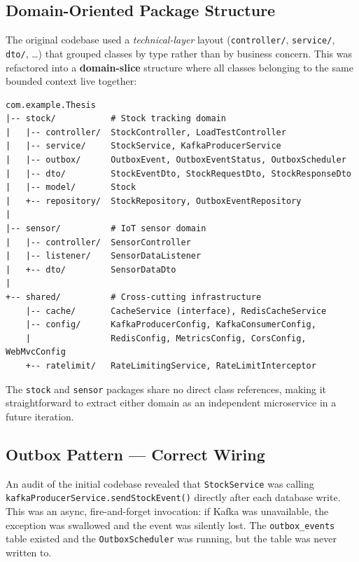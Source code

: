 \documentclass[12pt,a4paper,twoside]{article}
\begin{document}
\subsection{Domain-Oriented Package Structure}

The original codebase used a \emph{technical-layer} layout
(\texttt{controller/}, \texttt{service/}, \texttt{dto/}, \ldots{}) that
grouped classes by type rather than by business concern.
This was refactored into a \textbf{domain-slice} structure where all classes
belonging to the same bounded context live together:

\begin{lstlisting}[style=yamlStyle,
  caption={Domain-sliced Java package layout (final)}]
com.example.Thesis
|-- stock/           # Stock tracking domain
|   |-- controller/  StockController, LoadTestController
|   |-- service/     StockService, KafkaProducerService
|   |-- outbox/      OutboxEvent, OutboxEventStatus, OutboxScheduler
|   |-- dto/         StockEventDto, StockRequestDto, StockResponseDto
|   |-- model/       Stock
|   +-- repository/  StockRepository, OutboxEventRepository
|
|-- sensor/          # IoT sensor domain
|   |-- controller/  SensorController
|   |-- listener/    SensorDataListener
|   +-- dto/         SensorDataDto
|
+-- shared/          # Cross-cutting infrastructure
    |-- cache/       CacheService (interface), RedisCacheService
    |-- config/      KafkaProducerConfig, KafkaConsumerConfig,
    |                RedisConfig, MetricsConfig, CorsConfig, WebMvcConfig
    +-- ratelimit/   RateLimitingService, RateLimitInterceptor
\end{lstlisting}

The \texttt{stock} and \texttt{sensor} packages share no direct class
references, making it straightforward to extract either domain as an
independent microservice in a future iteration.

\subsection{Outbox Pattern --- Correct Wiring}

An audit of the initial codebase revealed that \texttt{StockService} was
calling \texttt{kafkaProducerService.sendStockEvent()} directly after each
database write. This was an async, fire-and-forget invocation: if Kafka was
unavailable, the exception was swallowed and the event was silently lost.
The \texttt{outbox\_events} table existed and the \texttt{OutboxScheduler}
was running, but the table was never written to.
\end{document}
